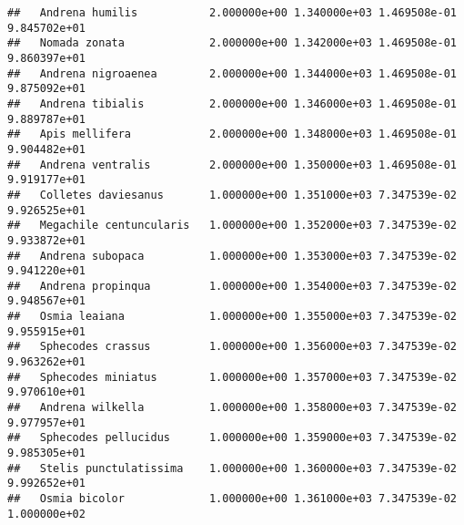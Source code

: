\documentclass[
]{article}
\begin{document}
\begin{verbatim}
##   Andrena humilis           2.000000e+00 1.340000e+03 1.469508e-01 9.845702e+01
##   Nomada zonata             2.000000e+00 1.342000e+03 1.469508e-01 9.860397e+01
##   Andrena nigroaenea        2.000000e+00 1.344000e+03 1.469508e-01 9.875092e+01
##   Andrena tibialis          2.000000e+00 1.346000e+03 1.469508e-01 9.889787e+01
##   Apis mellifera            2.000000e+00 1.348000e+03 1.469508e-01 9.904482e+01
##   Andrena ventralis         2.000000e+00 1.350000e+03 1.469508e-01 9.919177e+01
##   Colletes daviesanus       1.000000e+00 1.351000e+03 7.347539e-02 9.926525e+01
##   Megachile centuncularis   1.000000e+00 1.352000e+03 7.347539e-02 9.933872e+01
##   Andrena subopaca          1.000000e+00 1.353000e+03 7.347539e-02 9.941220e+01
##   Andrena propinqua         1.000000e+00 1.354000e+03 7.347539e-02 9.948567e+01
##   Osmia leaiana             1.000000e+00 1.355000e+03 7.347539e-02 9.955915e+01
##   Sphecodes crassus         1.000000e+00 1.356000e+03 7.347539e-02 9.963262e+01
##   Sphecodes miniatus        1.000000e+00 1.357000e+03 7.347539e-02 9.970610e+01
##   Andrena wilkella          1.000000e+00 1.358000e+03 7.347539e-02 9.977957e+01
##   Sphecodes pellucidus      1.000000e+00 1.359000e+03 7.347539e-02 9.985305e+01
##   Stelis punctulatissima    1.000000e+00 1.360000e+03 7.347539e-02 9.992652e+01
##   Osmia bicolor             1.000000e+00 1.361000e+03 7.347539e-02 1.000000e+02
\end{verbatim}
\end{document}
